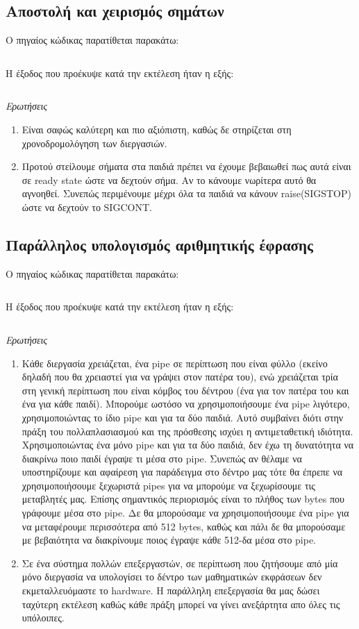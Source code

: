 \documentclass[a4paper,10pt]{article} \usepackage{anysize}
\begin{document}
\subsection{Αποστολή και χειρισμός σημάτων} Ο πηγαίος κώδικας
παρατίθεται παρακάτω:
\inputminted[linenos,fontsize=\footnotesize,frame=leftline]{c}{files/ask2-signals.c}
\pagebreak

Η έξοδος που προέκυψε κατά την εκτέλεση ήταν η εξής:
\inputminted[linenos,fontsize=\footnotesize,frame=leftline]{bash}{files/ask2-signals.out}
\emph{Ερωτήσεις}
\begin{enumerate}
\item Είναι σαφώς καλύτερη και πιο αξιόπιστη, καθώς δε στηρίζεται στη
χρονοδρομολόγηση των διεργασιών.
\item Προτού στείλουμε σήματα στα παιδιά πρέπει να έχουμε βεβαιωθεί πως αυτά
είναι σε ready state ώστε να δεχτούν σήμα. Αν το κάνουμε νωρίτερα αυτό θα
αγνοηθεί. Συνεπώς περιμένουμε μέχρι όλα τα παιδιά να κάνουν raise(SIGSTOP)
ώστε να δεχτούν το SIGCONT.
\end{enumerate}

\subsection{Παράλληλος υπολογισμός αριθμητικής έφρασης} Ο πηγαίος κώδικας
παρατίθεται παρακάτω:
\inputminted[linenos,fontsize=\footnotesize,frame=leftline]{c}{files/ask2-pipes.c}

Η έξοδος που προέκυψε κατά την εκτέλεση ήταν η εξής:
\inputminted[linenos,fontsize=\footnotesize,frame=leftline]{bash}{files/ask2-pipes.out}
\emph{Ερωτήσεις}
\begin{enumerate}
\item Κάθε διεργασία χρειάζεται, ένα pipe σε περίπτωση που είναι φύλλο (εκείνο
δηλαδή που θα χρειαστεί για να γράψει στον πατέρα του), ενώ χρειάζεται τρία
στη γενική περίπτωση που είναι κόμβος του δέντρου
(ένα για τον πατέρα του και ένα για κάθε παιδί). Μπορούμε ωστόσο να
χρησιμοποιήσουμε ένα pipe λιγότερο, χρησιμοποιώντας το ίδιο pipe και για τα
δύο παιδιά. Αυτό συμβαίνει διότι στην πράξη του πολλαπλασιασμού και της πρόσθεσης
ισχύει η αντιμεταθετική ιδιότητα. Χρησιμοποιώντας ένα μόνο pipe και για τα
δύο παιδιά, δεν έχω τη δυνατότητα να διακρίνω ποιο παιδί έγραψε τι μέσα στο
pipe. Συνεπώς αν θέλαμε να υποστηρίζουμε και αφαίρεση για παράδειγμα στο δέντρο μας τότε θα
έπρεπε να χρησιμοποιήσουμε ξεχωριστά pipes για να μπορούμε να ξεχωρίσουμε τις
μεταβλητές μας. Επίσης σημαντικός περιορισμός είναι το πλήθος των bytes που
γράφουμε μέσα στο pipe. Δε θα μπορούσαμε να χρησιμοποιήσουμε ένα pipe για να
μεταφέρουμε περισσότερα από 512 bytes, καθώς και πάλι δε θα μπορούσαμε με
βεβαιότητα να διακρίνουμε ποιος έγραψε κάθε 512-δα μέσα στο pipe.
\item Σε ένα σύστημα πολλών επεξεργαστών, σε περίπτωση που ζητήσουμε από μία
μόνο διεργασία να υπολογίσει το δέντρο των μαθηματικών εκφράσεων δεν
εκμεταλλευόμαστε το hardware. Η παράλληλη επεξεργασία θα μας δώσει ταχύτερη
εκτέλεση καθώς κάθε πράξη μπορεί να γίνει ανεξάρτητα απο όλες τις υπόλοιπες.
\end{enumerate}
\end{document}
